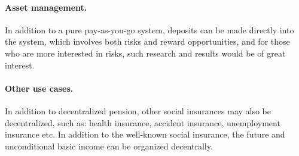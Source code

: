 \paragraph{Asset management.} In addition to a pure pay-as-you-go system, deposits can be made directly into the system, which involves both risks and reward opportunities, and for those who are more interested in risks, such research and results would be of great interest.

\paragraph{Other use cases.} In addition to decentralized pension, other social insurances may also be decentralized, such as: health insurance, accident insurance, unemployment insurance etc. In addition to the well-known social insurance, the future and unconditional basic income can be organized decentrally. 
